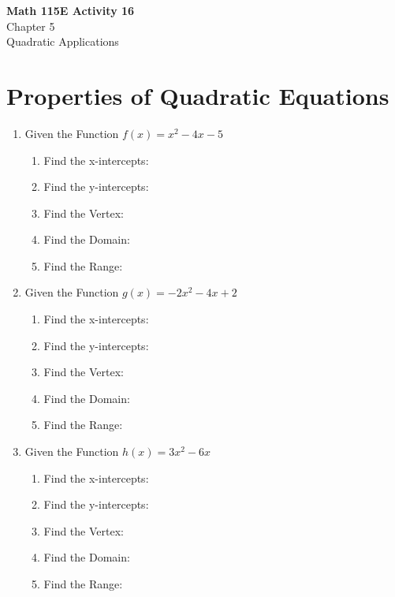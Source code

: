 \documentclass[12pt]{article}
\begin{document}
\begin{center}
    \Large \textbf{Math 115E Activity 16} \\
    \vspace{0.2cm}
    \normalsize Chapter 5 \\
    \normalsize Quadratic Applications
\end{center}
\vspace{-0.5cm}
\noindent
\section*{Properties of Quadratic Equations}

\noindent
\begin{enumerate}[label=\#\arabic*]
    \item Given the Function $f(x)=x^2-4x-5$
    \begin{enumerate}
        \item Find the x-intercepts:
        \\
        \item Find the y-intercepts:
        \\
        \item Find the Vertex:
        \\
        \item Find the Domain:
        \\
        \item Find the Range:
    \end{enumerate}
    \vspace{1cm}
    \item Given the Function $g(x)=-2x^2-4x+2$
    \begin{enumerate}
        \item Find the x-intercepts:
        \\
        \item Find the y-intercepts:
        \\
        \item Find the Vertex:
        \\
        \item Find the Domain:
        \\
        \item Find the Range:
    \end{enumerate}
    \vspace{1cm}
    \item Given the Function $h(x)=3x^2-6x$
    \begin{enumerate}
        \item Find the x-intercepts:
        \\
        \item Find the y-intercepts:
        \\
        \item Find the Vertex:
        \\
        \item Find the Domain:
        \\
        \item Find the Range:
    \end{enumerate}

\end{enumerate}
\end{document}
